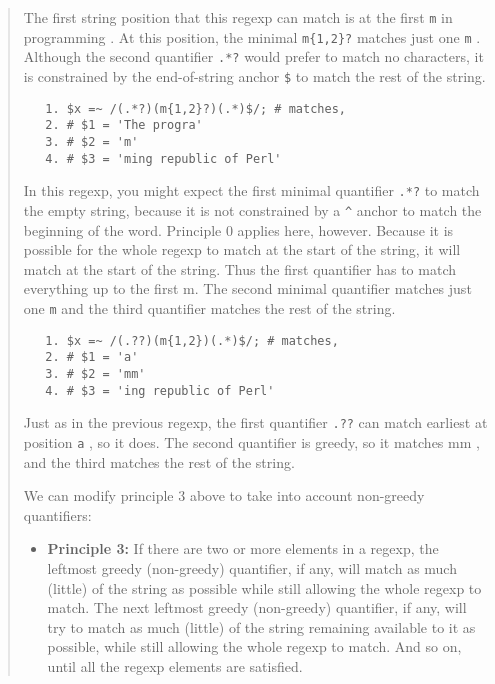 \begin{it}
\begin{quotation}
The first string position that this regexp can match is at the first
\verb'm' in programming . At this position, the minimal \verb|m{1,2}?| matches just
one \verb'm' . Although the second quantifier \verb|.*?| would prefer to match no
characters, it is constrained by the end-of-string anchor \verb|$| to match
the rest of the string.

\begin{verbatim}
   1. $x =~ /(.*?)(m{1,2}?)(.*)$/; # matches,
   2. # $1 = 'The progra'
   3. # $2 = 'm'
   4. # $3 = 'ming republic of Perl'
\end{verbatim}

In this regexp, you might expect the first minimal quantifier \verb|.*?| to match
the empty string, because it is not constrained by a \verb|^| anchor to match
the beginning of the word. Principle 0 applies here, however. Because it
is possible for the whole regexp to match at the start of the string, it
will match at the start of the string. Thus the first quantifier has to
match everything up to the first m. The second minimal quantifier matches
just one \verb|m| and the third quantifier matches the rest of the string.

\begin{verbatim}
   1. $x =~ /(.??)(m{1,2})(.*)$/; # matches,
   2. # $1 = 'a'
   3. # $2 = 'mm'
   4. # $3 = 'ing republic of Perl'
\end{verbatim}

Just as in the previous regexp, the first quantifier \verb|.??| can match
earliest at position \verb'a' , so it does. The second quantifier is greedy,
so it matches mm , and the third matches the rest of the string.

We can modify principle 3 above to take into account non-greedy quantifiers:

\begin{itemize}
    \item

      {\bf Principle 3:} If there are two or more elements in a regexp, the
      leftmost greedy (non-greedy) quantifier, if any, will match as much
      (little) of the string as possible while still allowing the whole
      regexp to match. The next leftmost greedy (non-greedy) quantifier,
      if any, will try to match as much (little) of the string remaining
      available to it as possible, while still allowing the whole regexp
      to match. And so on, until all the regexp elements are satisfied.
\end{itemize}
\end{quotation}
\end{it}

